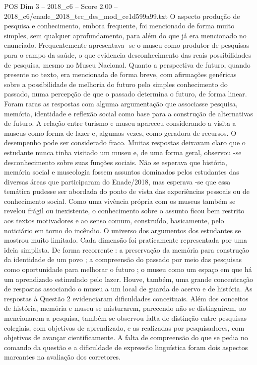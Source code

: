 \begin{textsample}{POS Dim 3 – 2018\_c6 – Score 2.00 – 2018\_c6/enade\_2018\_tec\_des\_mod\_ce1d599a99.txt}
O aspecto produção de pesquisa e conhecimento, embora frequente, foi mencionado de forma muito simples, sem qualquer aprofundamento, para além do que já era mencionado no enunciado.
Frequentemente apresentava -se o museu como produtor de pesquisas para o campo da saúde, o que evidencia desconhecimento das reais possibilidades de pesquisa, mesmo no Museu Nacional.
Quanto a perspectiva de futuro, quando presente no texto, era mencionada de forma breve, com afirmações genéricas sobre a possibilidade de melhoria do futuro pelo simples conhecimento do passado, numa percepção de que o passado determina o futuro, de forma linear.
Foram raras as respostas com alguma argumentação que associasse pesquisa, memória, identidade e reflexão social como base para a construção de alternativas de futuro.
A relação entre turismo e museu apareceu considerando a visita a museus como forma de lazer e, algumas vezes, como geradora de recursos.
O desempenho pode ser considerado fraco.
Muitas respostas deixavam claro que o estudante nunca tinha visitado um museu e, de uma forma geral, observou -se desconhecimento sobre suas funções sociais.
Não se esperava que história, memória social e museologia fossem assuntos dominados pelos estudantes das diversas áreas que participaram do Enade/2018, mas esperava -se que essa temática pudesse ser abordada do ponto de vista das experiências pessoais ou de conhecimento social.
Como uma vivência própria com os museus também se revelou frágil ou inexistente, o conhecimento sobre o assunto ficou bem restrito aos textos motivadores e ao senso comum, construído, basicamente, pelo noticiário em torno do incêndio.
O universo dos argumentos dos estudantes se mostrou muito limitado.
Cada dimensão foi praticamente representada por uma ideia simplista.
De forma recorrente : a preservação da memória para construção da identidade de um povo ; a compreensão do passado por meio das pesquisas como oportunidade para melhorar o futuro ; o museu como um espaço em que há um aprendizado estimulado pelo lazer.
Houve, também, uma grande concentração de respostas associando o museu a um local de guarda de acervo e de história.
As respostas à Questão 2 evidenciaram dificuldades conceituais.
Além dos conceitos de história, memória e museu se misturarem, parecendo não se distinguirem, ao mencionarem a pesquisa, também se observou falta de distinção entre pesquisas colegiais, com objetivos de aprendizado, e as realizadas por pesquisadores, com objetivos de avançar cientificamente.
A falta de compreensão do que se pedia no comando da questão e a dificuldade de expressão linguística foram dois aspectos marcantes na avaliação dos corretores.

\end{textsample}
